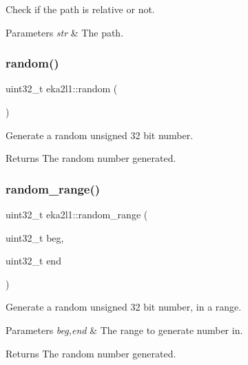 Check if the path is relative or not. 


\begin{DoxyParams}{Parameters}
{\em str} & The path. \\
\hline
\end{DoxyParams}
\mbox{\label{namespaceeka2l1_acb2c880cfe6f9726bb5c5fccc2c7381b}} 
\subsubsection{\texorpdfstring{random()}{random()}}
{\footnotesize\ttfamily uint32\+\_\+t eka2l1\+::random (\begin{DoxyParamCaption}{ }\end{DoxyParamCaption})}



Generate a random unsigned 32 bit number. 

\begin{DoxyReturn}{Returns}
The random number generated. 
\end{DoxyReturn}
\mbox{\label{namespaceeka2l1_afe59d27e6c6ed6d22a242873174d4872}} 
\subsubsection{\texorpdfstring{random\+\_\+range()}{random\_range()}}
{\footnotesize\ttfamily uint32\+\_\+t eka2l1\+::random\+\_\+range (\begin{DoxyParamCaption}\item[{uint32\+\_\+t}]{beg,  }\item[{uint32\+\_\+t}]{end }\end{DoxyParamCaption})}



Generate a random unsigned 32 bit number, in a range. 


\begin{DoxyParams}{Parameters}
{\em beg,end} & The range to generate number in. \\
\hline
\end{DoxyParams}
\begin{DoxyReturn}{Returns}
The random number generated. 
\end{DoxyReturn}
\mbox{\label{namespaceeka2l1_a939be2d2d8d0a2ed1a51c25ca499084a}} 
